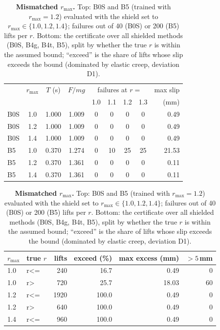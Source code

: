 \begin{table}[!htbp]\centering\footnotesize
\caption{\textbf{Mismatched $r_{\max}$.} Top: B0S and B5 (trained with $r_{\max}=1.2$) evaluated with the shield set to
$r_{\max}\in\{1.0,1.2,1.4\}$; failures out of 40 (B0S) or 200 (B5) lifts per $r$. Bottom: the certificate over all
shielded methods (B0S, B4g, B4t, B5), split by whether the true $r$ is within the assumed bound; ``exceed'' is the share of
lifts whose slip exceeds the bound (dominated by elastic creep, deviation D1).}\label{tab:rmax}
\setlength{\tabcolsep}{3pt}
\begin{tabular}{@{}lcccccccr@{}}\toprule
 & $r_{\max}$ & $T$ (s) & $F/mg$ & \multicolumn{4}{c}{failures at $r=$} & max slip\\
 & & & & 1.0 & 1.1 & 1.2 & 1.3 & (mm)\\\midrule
B0S & 1.0 & 1.000 & 1.009 & 0 & 0 & 0 & 0 & 0.49\\
B0S & 1.2 & 1.000 & 1.009 & 0 & 0 & 0 & 0 & 0.49\\
B0S & 1.4 & 1.000 & 1.009 & 0 & 0 & 0 & 0 & 0.49\\
B5 & 1.0 & 0.370 & 1.274 & 0 & 10 & 25 & 25 & 21.53\\
B5 & 1.2 & 0.370 & 1.361 & 0 & 0 & 0 & 0 & 0.11\\
B5 & 1.4 & 0.370 & 1.361 & 0 & 0 & 0 & 0 & 0.11\\
\bottomrule\end{tabular}

\vspace{6pt}
\begin{tabular}{@{}llrrrr@{}}\toprule
$r_{\max}$ & true $r$ & lifts & exceed (\%) & max excess (mm) & $>5$\,mm\\\midrule
1.0 & r<= & 240 & 16.7 & 0.49 & 0\\
1.0 & r> & 720 & 25.7 & 18.03 & 60\\
1.2 & r<= & 1920 & 100.0 & 0.49 & 0\\
1.2 & r> & 640 & 100.0 & 0.49 & 0\\
1.4 & r<= & 960 & 100.0 & 0.49 & 0\\
\bottomrule\end{tabular}\end{table}